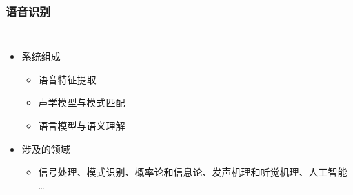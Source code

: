 \documentclass{beamer}
\begin{document}
\begin{frame}
	\frametitle{语音识别}
	\begin{columns}
	\begin{itemize}
		\item 系统组成
		\begin{itemize}
			\item 语音特征提取
			\item 声学模型与模式匹配
			\item 语言模型与语义理解
		\end{itemize}
		\item 涉及的领域
		\begin{itemize}
			\item 信号处理、模式识别、概率论和信息论、发声机理和听觉机理、人工智能 \dots
		\end{itemize}
	\end{itemize}
	\end{columns}
\end{frame}
\end{document}
